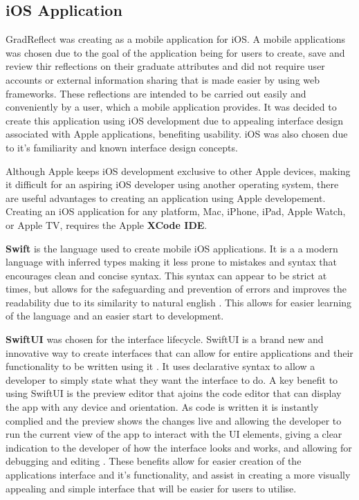 \documentclass{l4proj}
\begin{document}
\subsection{iOS Application}

GradReflect was creating as a mobile application for iOS. A mobile applications was chosen
due to the goal of the application being for users to create, save and review thir reflections on their graduate attributes and did not require user accounts 
or external information sharing that is made easier by using web frameworks. These reflections are intended to be carried out easily and conveniently by a user,
which a mobile application provides. It was decided to create this application using iOS development due to appealing interface design associated with Apple 
applications, benefiting usability. iOS was also chosen due to it's familiarity and known interface design concepts.

Although Apple keeps iOS development exclusive to other Apple devices, making it difficult for an aspiring iOS developer using another operating system, 
there are useful advantages to creating an application using Apple developement. Creating an iOS application for any platform, Mac, iPhone, iPad, Apple Watch, 
or Apple TV, requires the Apple \textbf{XCode IDE}. 

\textbf{Swift} is the language used to create mobile iOS applications. It is a a modern language with inferred types making it less prone to mistakes and syntax 
that encourages clean and concise syntax. This syntax can appear to be strict at times, but allows for the safeguarding and prevention of errors and improves 
the readability due to its similarity to natural english \citep{altexsoft_swift_2021}. This allows for easier learning of the language and an easier start 
to development.

\textbf{SwiftUI} was chosen for the interface lifecycle. SwiftUI is a brand new and innovative way to create interfaces that can allow for entire applications and 
their functionality to be written using it \citep{apple_developer_xcode_2021}. It uses declarative syntax to allow a developer to simply state what they want 
the interface to do. A key benefit to using SwiftUI is the preview editor that ajoins the code editor that can display the app with any device and orientation. 
As code is written it is instantly complied and the preview shows the changes live and allowing the developer to run the current view of the app to interact 
with the UI elements, giving a clear indication to the developer of how the interface looks and works, and allowing for debugging and editing 
\citep{apple_swiftui_2021}. These benefits allow for easier creation of the applications interface and it's functionality, and assist in creating a more 
visually appealing and simple interface that will be easier for users to utilise.
\end{document}
